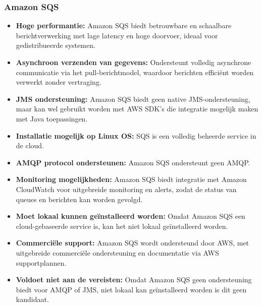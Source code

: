 \subsubsection{Amazon SQS}
\begin{itemize}
    \item \textbf{Hoge performantie:} Amazon SQS biedt betrouwbare en schaalbare berichtverwerking met lage latency en hoge doorvoer, ideaal voor gedistribueerde systemen.
    \item \textbf{Asynchroon verzenden van gegevens:} Ondersteunt volledig asynchrone communicatie via het pull-berichtmodel, waardoor berichten efficiënt worden verwerkt zonder vertraging.
    \item \textbf{JMS ondersteuning:} Amazon SQS biedt geen native JMS-ondersteuning, maar kan wel gebruikt worden met AWS SDK's die integratie mogelijk maken met Java toepassingen.
    \item \textbf{Installatie mogelijk op Linux OS:} SQS is een volledig beheerde service in de cloud.
    \item \textbf{AMQP protocol ondersteunen:} Amazon SQS ondersteunt geen AMQP.
    \item \textbf{Monitoring mogelijkheden:} Amazon SQS biedt integratie met Amazon CloudWatch voor uitgebreide monitoring en alerts, zodat de status van queues en berichten kan worden gevolgd.
    \item \textbf{Moet lokaal kunnen geïnstalleerd worden:} Omdat Amazon SQS een cloud-gebaseerde service is, kan het niet lokaal geïnstalleerd worden.
    \item \textbf{Commerciële support:} Amazon SQS wordt ondersteund door AWS, met uitgebreide commerciële ondersteuning en documentatie via AWS supportplannen.
    \item \textbf{Voldoet niet aan de vereisten:}
    Omdat Amazon SQS geen ondersteuning biedt voor AMQP of JMS, niet lokaal kan geïnstalleerd worden is dit geen kandidaat.
\end{itemize}




